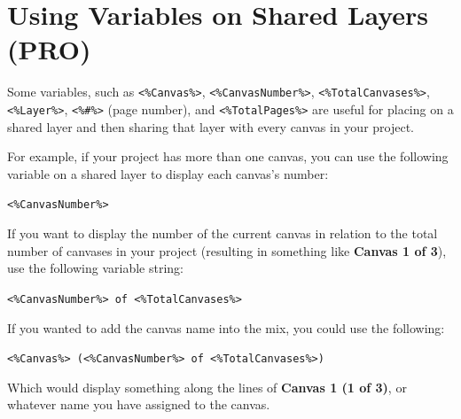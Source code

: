 \documentclass[../main.tex]{subfiles}
\begin{document}
\section{Using Variables on Shared Layers (\texorpdfstring{\textbf{PRO}}{PRO})}

\begin{ogpro}
  Some variables, such as \texttt{<\%Canvas\%>}, \texttt{<\%CanvasNumber\%>},
  \texttt{<\%TotalCanvases\%>}, \texttt{<\%Layer\%>}, \texttt{<\%\#\%>} (page number), and
  \texttt{<\%TotalPages\%>} are useful for placing on a shared layer and then sharing that layer
  with every canvas in your project.

  For example, if your project has more than one canvas, you can use the following variable on a
  shared layer to display each canvas's number:

  \texttt{<\%CanvasNumber\%>}

  If you want to display the number of the current canvas in relation to the total number of
  canvases in your project (resulting in something like \textbf{Canvas 1 of 3}), use the
  following variable string:

  \texttt{<\%CanvasNumber\%> of <\%TotalCanvases\%>}

  If you wanted to add the canvas name into the mix, you could use the following:

  \texttt{<\%Canvas\%> (<\%CanvasNumber\%> of <\%TotalCanvases\%>)}

  Which would display something along the lines of \textbf{Canvas 1 (1 of 3)}, or whatever name
  you have assigned to the canvas.
\end{ogpro}
\end{document}
